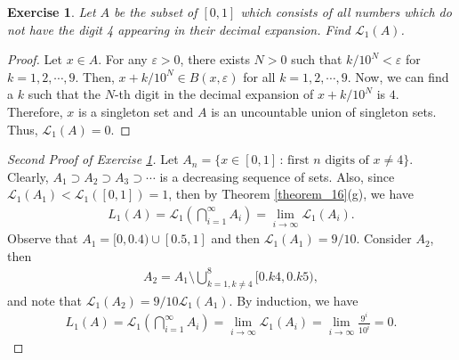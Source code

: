 \documentclass[11pt]{book}
\newtheorem{exercise}{Exercise}[chapter]
\theoremstyle{definition}
\numberwithin{equation}{chapter}
\def\L{{\mathcal L}}
\begin{document}
\medskip

\begin{exercise}\label{exe_116}
Let $A$ be the subset of $[0,1]$ which consists of all numbers which do not have the digit 4 appearing in their decimal expansion. Find $\mathcal{L}_1(A)$.
\end{exercise}
\begin{proof}\cite{22}
Let $x \in A$. For any $\varepsilon > 0$, there exists $N > 0$ such that $k/10^N < \varepsilon$ for $k = 1,2,\cdots,9$. Then, $x + k/10^N \in B(x,\varepsilon)$ for all $k = 1,2,\cdots,9$. Now, we can find a $k$ such that the $N$-th digit in the decimal expansion of $x + k/10^N$ is $4$. Therefore, $x$ is a singleton set and $A$ is an uncountable union of singleton sets. Thus, $\mathcal{L}_1(A) = 0$.
\end{proof}

\medskip

\begin{proof}[Second Proof of Exercise \ref{exe_116}]
Let $A_n = \{x \in [0,1] \,:\, \text{first $n$ digits of } x \neq 4 \}$. Clearly, $A_1 \supset A_2 \supset A_3 \supset \cdots$ is a decreasing sequence of sets. Also, since $\L_1(A_1) < \L_1([0,1]) = 1$, then by Theorem \ref{theorem_16}(g), we have
\begin{align*}
    L_1(A) = \L_1\left(\bigcap^\infty_{i=1} A_i\right) = \lim_{i\to\infty} \L_1(A_i).
\end{align*}
Observe that $A_1 = [0,0.4) \cup [0.5,1]$ and then $\L_1(A_1) = 9/10$. Consider $A_2$, then
\begin{align*}
    A_2 = A_1 \setminus \bigcup^8_{k=1,k\neq 4}[0.k4,0.k5),
\end{align*}
and note that $\L_1(A_2) = 9/10 \L_1(A_1)$. By induction, we have
\begin{align*}
    L_1(A) = \L_1\left(\bigcap^\infty_{i=1} A_i\right) = \lim_{i\to\infty} \L_1(A_i) = \lim_{i\to\infty} \frac{9^i}{10^i} = 0.
\end{align*}
\end{proof}

\medskip
\end{document}
